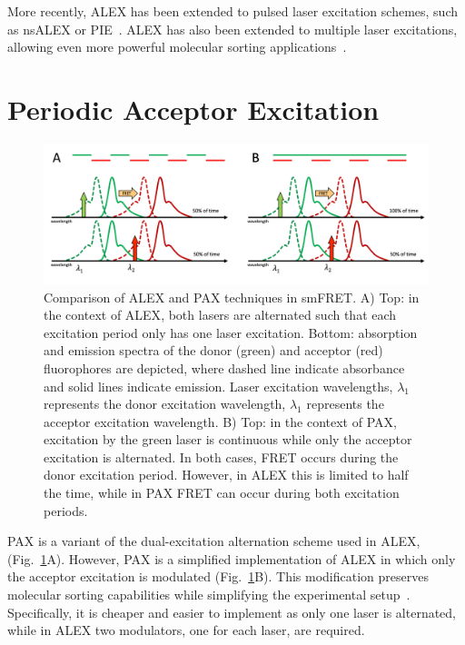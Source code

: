 More recently, \ac{ALEX} has been extended to pulsed laser excitation schemes, such as \ac{nsALEX} or \ac{PIE}~\cite{laurence_PNAS_2005, muller_BJ_2005}. 
\ac{ALEX} has also been extended to multiple laser excitations, allowing even more powerful molecular sorting applications~\cite{lee_BPJ_2007, yim_CC_2012}.

\section{Periodic Acceptor Excitation}
\label{sec:PAX_intro}

\begin{figure}
    \centering
    \includegraphics[width=\textwidth]{chapters/figures/ALEX_vs_PAX.jpg}
    \caption{\label{fig:ALEX_vs_PAX} 
    Comparison of \ac{ALEX} and \ac{PAX} techniques in \ac{smFRET}.
    A) Top: in the context of \ac{ALEX}, both lasers are alternated such that each excitation period only has one laser excitation.
    Bottom: absorption and emission spectra of the donor (green) and acceptor (red) fluorophores are depicted, where dashed line indicate absorbance and solid lines indicate emission. 
    Laser excitation wavelengths, $\lambda_1$ represents the donor excitation wavelength, $\lambda_1$ represents the acceptor excitation wavelength. 
    B) Top: in the context of \ac{PAX}, excitation by the green laser is continuous while only the acceptor excitation is alternated.
    In both cases, FRET occurs during the donor excitation period.
    However, in \ac{ALEX} this is limited to half the time, while in \ac{PAX} FRET can occur during both excitation periods. 
    }
\end{figure}

\ac{PAX} is a variant of the dual-excitation alternation scheme used in \ac{ALEX}, (Fig.~\ref{fig:ALEX_vs_PAX}A). 
However, \ac{PAX} is a simplified implementation of \ac{ALEX} in which only the acceptor excitation is modulated (Fig.~\ref{fig:ALEX_vs_PAX}B). 
This modification preserves molecular sorting capabilities while simplifying the experimental setup~\cite{doose_EBJ_2007}.
Specifically, it is cheaper and easier to implement as only one laser is alternated, while in \ac{ALEX} two modulators, one for each laser, are required.

